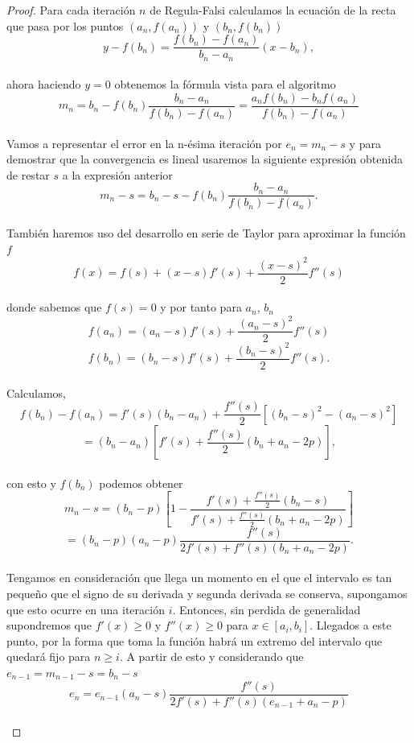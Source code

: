 \begin{proof}
	Para cada iteración $n$ de Regula-Falsi calculamos la ecuación de la recta que pasa por los puntos $(a_n, f(a_n))$ y $(b_n, f(b_n))$
	${ }$\\
	\[
		y - f(b_n) = \frac{f(b_n) - f(a_n)}{b_n - a_n}(x - b_n),
	\]
	${ }$\\
	ahora haciendo $y = 0$ obtenemos la fórmula vista para el algoritmo
	${ }$\\
	\[
		m_n = b_n - f(b_n) \frac{b_n - a_n}{f(b_n) - f(a_n)} = \frac{a_n f(b_n) - b_n f(a_n)}{f(b_n) - f(a_n)}
	\]
	${ }$\\
	
	Vamos a representar el error en la n-ésima iteración por $e_n = m_n - s$ y para demostrar que la convergencia es lineal usaremos la siguiente expresión obtenida de restar $s$ a la expresión anterior
	${ }$\\
	\[
		m_n - s = b_n - s - f(b_n) \frac{b_n - a_n}{f(b_n) - f(a_n)}.
	\]
	${ }$\\
	
	También haremos uso del desarrollo en serie de Taylor para aproximar la función $f$
	${ }$\\
	\[
		f(x) = f(s) + (x - s) f'(s) + \frac{(x - s)^2}{2} f''(s)
	\]
	${ }$\\
	donde sabemos que $f(s) = 0$ y por tanto para $a_n$, $b_n$
	${ }$\\
	\[
		f(a_n) = (a_n - s) f'(s) + \frac{(a_n - s)^2}{2} f''(s)
	\]
	\[
		f(b_n) = (b_n - s) f'(s) + \frac{(b_n - s)^2}{2} f''(s).
	\]
	${ }$\\
	Calculamos,
	${ }$\\
	\[
		f(b_n) - f(a_n) = f'(s) (b_n - a_n) + \frac{f''(s)}{2}[(b_n - s)^2 - (a_n - s)^2]
	\]
	\[
		= (b_n - a_n) [f'(s) + \frac{f''(s)}{2} (b_n + a_n - 2p)],
	\]
	${ }$\\
	con esto y $f(b_n)$ podemos obtener
	${ }$\\
	\[
		m_n - s = (b_n - p)[1 - \frac{f'(s) + \frac{f''(s)}{2} (b_n - s)}{f'(s) + \frac{f''(s)}{2} (b_n + a_n - 2p)}]
	\]
	\[
		= (b_n - p) (a_n - p) \frac{f''(s)}{2 f'(s) + f''(s) (b_n + a_n - 2p)}.
	\]
	${ }$\\
	
	Tengamos en consideración que llega un momento en el que el intervalo es tan pequeño que el signo de su derivada y segunda derivada se conserva, supongamos que esto ocurre en una iteración $i$. Entonces, sin perdida de generalidad supondremos que $f'(x) \geq 0$ y $f''(x) \geq 0$ para $x \in [a_i, b_i]$. Llegados a este punto, por la forma que toma la función habrá un extremo del intervalo que quedará fijo para $n \geq i$. A partir de esto y considerando que $e_{n-1} = m_{n-1} - s = b_n - s$
	${ }$\\
	\[
		e_n = e_{n-1} (a_n - s) \frac{f''(s)}{2 f'(s) + f''(s) (e_{n-1} + a_n - p)}
	\]
	${ }$\\
	

\end{proof}
